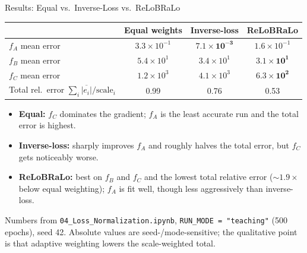 \documentclass[aspectratio=169,11pt]{beamer}
\newcommand{\emphc}[1]{\textcolor{harvardcrimson}{#1}}
\begin{document}
\begin{frame}{Results: Equal vs.\ Inverse-Loss vs.\ ReLoBRaLo}
\footnotesize
\begin{center}
\renewcommand{\arraystretch}{1.05}
{\footnotesize
\begin{tabular}{@{}lccc@{}}
\toprule
 & \textbf{Equal weights} & \textbf{Inverse-loss} & \textbf{ReLoBRaLo} \\
\midrule
$f_A$ mean error & $3.3 \times 10^{-1}$ & $\bm{7.1 \times 10^{-3}}$ & $1.6 \times 10^{-1}$ \\
$f_B$ mean error & $5.4 \times 10^{1}$ & $3.4 \times 10^{1}$ & $\bm{3.1 \times 10^{1}}$ \\
$f_C$ mean error & $1.2 \times 10^{3}$ & $4.1 \times 10^{3}$ & $\bm{6.3 \times 10^{2}}$ \\
\midrule
Total rel.\ error $\sum_i \overline{|e_i|}/\text{scale}_i$ & 0.99 & 0.76 & \emphc{0.53} \\
\bottomrule
\end{tabular}
}
\end{center}

\vspace{0.15cm}
\begin{itemize}\itemsep1pt
    \item \textbf{Equal:} $f_C$ dominates the gradient; $f_A$ is the \emphc{least accurate} run and the total error is highest.
    \item \textbf{Inverse-loss:} sharply improves $f_A$ and roughly halves the total error, but $f_C$ gets noticeably worse.
    \item \textbf{ReLoBRaLo:} best on $f_B$ and $f_C$ and the \emphc{lowest total relative error} ($\sim 1.9\times$ below equal weighting); $f_A$ is fit well, though less aggressively than inverse-loss.
\end{itemize}

\vspace{0.1cm}
{\scriptsize Numbers from \texttt{04\_Loss\_Normalization.ipynb}, \texttt{RUN\_MODE = "teaching"} (500 epochs), seed 42.  Absolute values are seed-/mode-sensitive; the qualitative point is that adaptive weighting lowers the scale-weighted total.}
\end{frame}
\end{document}
